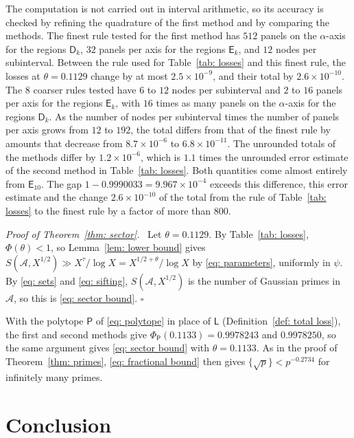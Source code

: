 \documentclass{article}
\numberwithin{equation}{section}
\newenvironment{proof}[1][Proof]{\par\medskip\noindent\textit{#1.}\ }{\hfill$\square$\par\medskip}
\begin{document}
The computation is not carried out in interval arithmetic, so its accuracy is checked by refining the quadrature of the first method and by comparing the methods. The finest rule tested for the first method has $512$ panels on the $\alpha$-axis for the regions $\mathsf{D}_k$, $32$ panels per axis for the regions $\mathsf{E}_k$, and $12$ nodes per subinterval. Between the rule used for Table~\ref{tab: losses} and this finest rule, the losses at $\theta = 0.1129$ change by at most $2.5 \times 10^{-9}$, and their total by $2.6 \times 10^{-10}$. The $8$ coarser rules tested have $6$ to $12$ nodes per subinterval and $2$ to $16$ panels per axis for the regions $\mathsf{E}_k$, with $16$ times as many panels on the $\alpha$-axis for the regions $\mathsf{D}_k$. As the number of nodes per subinterval times the number of panels per axis grows from $12$ to $192$, the total differs from that of the finest rule by amounts that decrease from $8.7 \times 10^{-6}$ to $6.8 \times 10^{-11}$. The unrounded totals of the methods differ by $1.2 \times 10^{-6}$, which is $1.1$ times the unrounded error estimate of the second method in Table~\ref{tab: losses}. Both quantities come almost entirely from $\mathsf{E}_{10}$. The gap $1 - 0.9990033 = 9.967 \times 10^{-4}$ exceeds this difference, this error estimate and the change $2.6 \times 10^{-10}$ of the total from the rule of Table~\ref{tab: losses} to the finest rule by a factor of more than $800$.

\begin{proof}[Proof of Theorem~\ref{thm: sector}]
Let $\theta = 0.1129$. By Table~\ref{tab: losses}, $\Phi(\theta) < 1$, so Lemma~\ref{lem: lower bound} gives $S(\mathcal{A}, X^{1/2}) \gg X^{\tau}/\log X = X^{1/2 + \theta}/\log X$ by \eqref{eq: parameters}, uniformly in $\psi$. By \eqref{eq: sets} and \eqref{eq: sifting}, $S(\mathcal{A}, X^{1/2})$ is the number of Gaussian primes in $\mathcal{A}$, so this is \eqref{eq: sector bound}.
\end{proof}

With the polytope $\mathsf{P}$ of \eqref{eq: polytope} in place of $\mathsf{L}$ (Definition~\ref{def: total loss}), the first and second methods give $\Phi_{\mathsf{P}}(0.1133) = 0.9978243$ and $0.9978250$, so the same argument gives \eqref{eq: sector bound} with $\theta = 0.1133$. As in the proof of Theorem~\ref{thm: primes}, \eqref{eq: fractional bound} then gives $\{\sqrt{p}\} < p^{-0.2734}$ for infinitely many primes.

\section{Conclusion}
\label{sec: conclusion}
\end{document}
